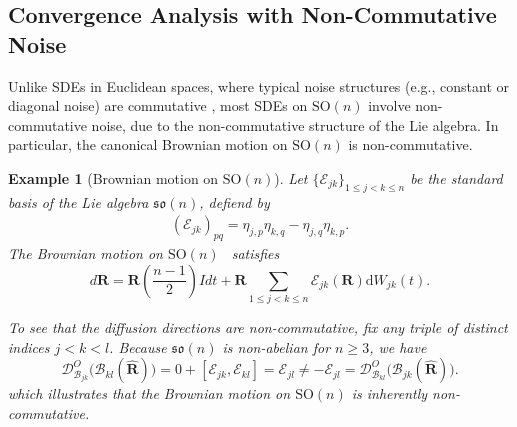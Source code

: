 \documentclass[11pt, a4paper, onecolumn]{article}
\newcommand{\SOn}{\mathrm{SO}(n)}
\newcommand{\son}{\mathfrak{so}(n)}
\newcommand{\DO}{\tg D^{O}}
\newcommand{\bfR}{\mathbf{R}}
\newcommand{\B}{\mathcal{B}}
\newcommand{\hatR}{\widehat{\bfR}}
\newcommand{\tg}[1]{\mathcal{#1}}
\newcommand{\nm}[1]{\mathsf{#1}}
\newcommand{\Der}[4]{
  #1_{#2}\bigl(#3(#4)\bigr)
}
\newtheorem{example}{Example}
\begin{document}


\subsection{Convergence Analysis with Non-Commutative Noise}
Unlike SDEs in Euclidean spaces, where typical noise structures (e.g., constant or diagonal noise) are commutative \cite{higham2021introduction}, most SDEs on $\mathrm{SO}(n)$ involve non-commutative noise, due to the non-commutative structure of the Lie algebra.  In particular, the canonical Brownian motion on $\mathrm{SO}(n)$ is non-commutative.

\begin{example}[Brownian motion on $\SOn$]\label{ex:bw-son}
Let $\{\tg E_{jk}\}_{1\le j<k\le n}$ be the standard basis of the Lie algebra $\son$, defiend by
\begin{align}\label{eq:std-b-son}
    (\tg E_{jk})_{pq}=\eta_{j,p}\eta_{k,q}-\eta_{j,q}\eta_{k,p}.
\end{align}
The Brownian motion on $\SOn$~\cite{hsu2002stochastic} satisfies
\[
  d\bfR= \bfR (\frac{n-1}{2})Idt + \bfR\sum_{1\le j<k\le n}\tg E_{jk}(\bfR) \mathrm dW_{jk}(t).
\]

To see that the diffusion directions are non-commutative, fix any triple of distinct indices $j < k < l$.  Because $\mathfrak{so}(n)$ is non-abelian for $n\ge 3$, we have~\cite{gallier2020differential} 
\[
   \Der{\DO}{\B_{jk}}{\B_{kl}}{\hatR} = 0 + [\tg E_{jk},\tg E_{kl}]=  \tg E_{jl} \neq - \tg E_{jl} = \Der{\DO}{\B_{kl}}{\B_{jk}}{\hatR}.
\]
which illustrates that the Brownian motion on $\SOn$ is inherently non-commutative.
\end{example}
\end{document}
